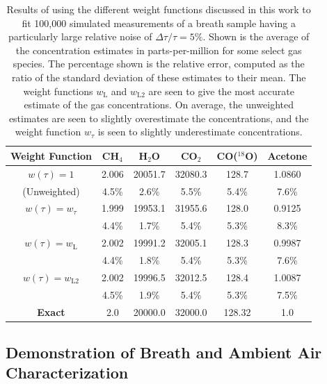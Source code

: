 \documentclass[12pt]{report}
\begin{document}
	\begin{table}[H]
		\caption{Results of using the different weight functions discussed in this work to fit 100,000 simulated measurements of a breath sample having a particularly large relative noise of $\Delta \tau/ \tau = 5\%$. Shown is the average of the concentration estimates in parts-per-million for some select gas species. The percentage shown is the relative error, computed as the ratio of the standard deviation of these estimates to their mean. The weight functions $w_\mathrm{L}$ and $w_\mathrm{L2}$ are seen to give the most accurate estimate of the gas concentrations. On average, the unweighted estimates are seen to slightly overestimate the concentrations, and the weight function $w_\tau$ is seen to slightly underestimate concentrations.}
		\begin{center}
			\begin{tabular}{|c|c|c|c|c|c|}
				\hline
				\textbf{Weight Function}    & \textbf{CH$_4$}      & \textbf{H$_2$O }     & \textbf{CO$_2$ } & \textbf{CO($^{18}$O) } & \textbf{Acetone} \\ \hline
				\hline
				$w(\tau) = 1$ &  2.006& 20051.7& 32080.3&  128.7 & 1.0860 \\
				(Unweighted)&    4.5\%&    2.6\%&    5.5\%&    5.4\%&    7.6\% \\ \hline
				$w(\tau) = w_\tau$ &  1.999& 19953.1& 31955.6&  128.0& 0.9125 \\
				&    4.4\%&    1.7\%&    5.4\%&    5.3\%&    8.3\% \\ \hline
				$w(\tau) = w_\mathrm{L}$ &  2.002& 19991.2& 32005.1&  128.3& 0.9987 \\
				&    4.4\%&    1.8\%&    5.4\%&    5.3\% &    7.6\%\\ \hline
				$w(\tau) = w_\mathrm{L2}$ &  2.002& 19996.5& 32012.5&  128.4& 1.0087 \\
				&    4.5\%&    1.9\%&    5.4\%&    5.3\% &    7.5\%\\ \hline \hline
				\textbf{Exact} &          2.0 &      20000.0 &      32000.0 &       128.32 & 1.0  \\ \hline
			\end{tabular}
		\end{center}
		\label{tbl:simulation_weight_results}
	\end{table}
	
	\subsection{Demonstration of Breath and Ambient Air Characterization}
	
\end{document}
